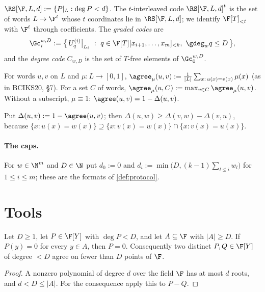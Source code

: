 \begin{definition}[Codes]\label{def:codes}\leanok
$\RS[\F,L,d]:=\{P|_L:\deg P<d\}$. The $t$-interleaved code $\RS[\F,L,d]^t$ is the set
of words $L\to\F^t$ whose $t$ coordinates lie in $\RS[\F,L,d]$; we identify
$\F[T]_{<t}$ with $\F^t$ through coefficients. The \emph{graded codes} are
\[
\Gc_i^{w,D}:=\big\{\,U^{(i)}_q\big|_{L_i}\ :\ q\in\F[T][x_{i+1},\dots,x_m]_{<k},\ \gdeg_w q\le D\,\big\},
\]
and the \emph{degree code} $C_{w,D}$ is the set of $T$-free elements of $\Gc_0^{w,D}$.
\end{definition}

\begin{definition}\label{def:agree}\leanok
For words $u,v$ on $L$ and $\mu:L\to[0,1]$,
$\agree_\mu(u,v):=\frac1{|L|}\sum_{x:\,u(x)=v(x)}\mu(x)$ (as in BCIKS20, \S7). For a set
$C$ of words, $\agree_\mu(u,C):=\max_{v\in C}\agree_\mu(u,v)$. Without a subscript,
$\mu\equiv1$: $\agree(u,v)=1-\Delta(u,v)$.
\end{definition}

Put $\Delta(u,v):=1-\agree(u,v)$; then $\Delta(u,w)\ge\Delta(v,w)-\Delta(v,u)$, because
$\{x:u(x)=w(x)\}\supseteq\{x:v(x)=w(x)\}\cap\{x:v(x)=u(x)\}$.

\paragraph{The caps.} For $w\in\N^m$ and $D\in\N$ put $d_0:=0$ and
$d_i:=\min\big(D,(k-1)\sum_{l\le i}w_l\big)$ for $1\le i\le m$; these are the formats of
\ref{def:protocol}.

\section{Tools}

\begin{lemma}\label{lem:roots}
Let $D\ge1$, let $P\in\F[Y]$ with $\deg P<D$, and let $A\subseteq\F$ with $|A|\ge D$. If
$P(y)=0$ for every $y\in A$, then $P=0$. Consequently two distinct $P,Q\in\F[Y]$ of degree $<D$
agree on fewer than $D$ points of $\F$.
\end{lemma}

\begin{proof}
A nonzero polynomial of degree $d$ over the field $\F$ has at most $d$ roots, and $d<D\le|A|$.
For the consequence apply this to $P-Q$.
\end{proof}

